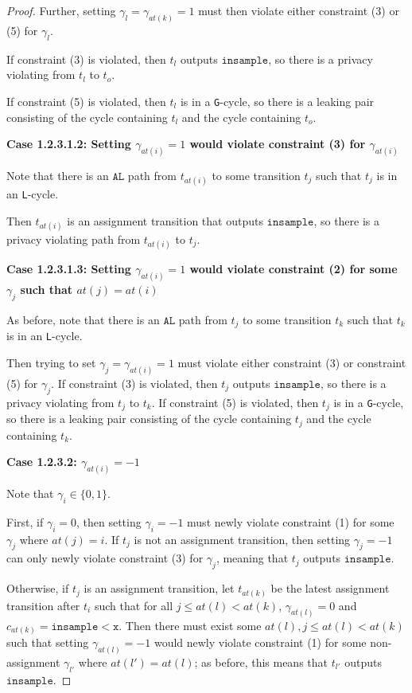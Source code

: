 \documentclass[12pt]{article}
\newcommand{\lguard}[1][x]{\texttt{insample} < #1}
\newcommand{\gcycle}{\texttt{G}-cycle}
\newcommand{\lcycle}{\texttt{L}-cycle}
\theoremstyle{definition}
\begin{document}
\begin{proof}
    Further, setting $\gamma_l = \gamma_{at(k)} = 1$ must then violate either constraint (3) or (5) for $\gamma_l$. 

    If constraint (3) is violated, then $t_l$ outputs $\texttt{insample}$, so there is a privacy violating from $t_l$ to $t_o$.

    If constraint (5) is violated, then $t_l$ is in a \gcycle, so there is a leaking pair consisting of the cycle containing $t_l$ and the cycle containing $t_o$. 

    \textbf{Case 1.2.3.1.2: Setting $\gamma_{at(i)}=1$ would violate constraint (3) for $\gamma_{at(i)}$}

    Note that there is an $\texttt{AL}$ path from $t_{at(i)}$ to some transition $t_j$ such that $t_j$ is in an \lcycle.

    Then $t_{at(i)}$ is an assignment transition that outputs $\texttt{insample}$, so there is a privacy violating path from $t_{at(i)}$ to $t_j$. 
    
    \textbf{Case 1.2.3.1.3: Setting $\gamma_{at(i)}=1$ would violate constraint (2) for some $\gamma_j$ such that $at(j) = at(i)$}

    As before, note that there is an $\texttt{AL}$ path from $t_{j}$ to some transition $t_k$ such that $t_k$ is in an \lcycle.

    Then trying to set $\gamma_j = \gamma_{at(i)} = 1$ must violate either constraint (3) or constraint (5) for $\gamma_j$. If constraint (3) is violated, then $t_j$ outputs $\texttt{insample}$, so there is a privacy violating from $t_j$ to $t_k$. If constraint (5) is violated, then $t_j$ is in a \gcycle, so there is a leaking pair consisting of the cycle containing $t_j$ and the cycle containing $t_k$.  

    \textbf{Case 1.2.3.2: $\gamma_{at(i)} = -1$}

    Note that $\gamma_i \in \{0, 1\}$.

    First, if $\gamma_i = 0$, then setting $\gamma_i = -1$ must newly violate constraint (1) for some $\gamma_j$ where $at(j) = i$. If $t_{j}$ is not an assignment transition, then setting $\gamma_{j} = -1$ can only newly violate constraint (3) for $\gamma_{j}$, meaning that $t_j$ outputs $\texttt{insample}$.

    Otherwise, if $t_j$ is an assignment transition, let $t_{at(k)}$ be the latest assignment transition after $t_{i}$ such that for all $j\leq at(l)< at(k)$, $\gamma_{at(l)} =0$ and $c_{at(k)} = \lguard[\texttt{x}]$. Then there must exist some $at(l), j\leq at(l)< at(k)$ such that setting $\gamma_{at(l)}=-1$ would newly violate constraint (1) for some non-assignment $\gamma_{l'}$ where $at(l') = at(l)$; as before, this means that $t_{l'}$ outputs $\texttt{insample}$.  


\end{proof}
\end{document}
